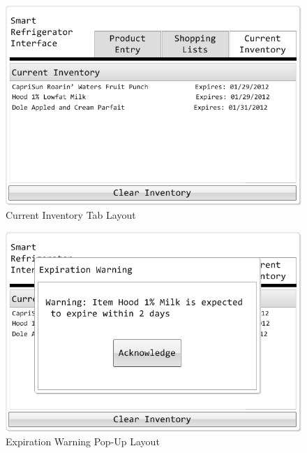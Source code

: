 \documentclass[11pt]{article} %
\begin{document}
\begin{figure}[h!]
\vspace{0.5cm}
\begin{center}
\includegraphics[scale=0.5]{MockUp3}
\caption{Current Inventory Tab Layout}
\label{mock3}
\end{center}
\end{figure}

\begin{figure}[h!]
\begin{center}
\includegraphics[scale=0.5]{MockUp4}
\caption{Expiration Warning Pop-Up Layout}
\label{mock4}
\end{center}
\end{figure}

\pagebreak
\end{document}
